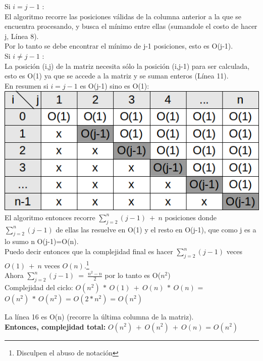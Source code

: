 Si $i=j-1$ :\\
El algoritmo recorre las posiciones válidas de la columna anterior a la que se encuentra procesando, y busca el mínimo entre ellas (sumandole el costo de hacer j, Línea 8).\\
Por lo tanto se debe encontrar el mínimo de j-1 posiciones, esto es O(j-1).\\

Si $i\neq j-1$ :\\
La posición (i,j) de la matriz necesita sólo la posición (i,j-1) para ser calculada, esto es O(1) ya que se accede a la matriz y se suman enteros (Línea 11).\\

En resumen si $i=j-1$ es O(j-1) sino es O(1):\\

\includegraphics[scale=0.7]{ej1/complejidad2.png}\\

El algoritmo entonces recorre $ \sum_{j=2}^{n} (j-1)\ +\ n$ posiciones donde $ \sum_{j=2}^{n} (j-1)$ de ellas las resuelve en O(1) y el resto en O(j-1), que como j es a lo sumo n O(j-1)=O(n).\\

Puedo decir entonces que la complejidad final es hacer $\sum_{j=2}^{n} (j-1)$ veces $O(1)\ +\ n$ veces $O(n)$.\footnote{Disculpen el abuso de notación}\\

Ahora $\sum_{j=2}^{n} (j-1)\ =\ \frac{n^{2}-n}{2}$ por lo tanto es O($n^{2}$)\\

Complejidad del ciclo: $O(n^{2})\ *\ O(1)\ +\ O(n)\ *\ O(n)$ = $O(n^{2})\ *\ O(n^{2})$ = $O(2*n^{2})$ = $O(n^{2})$

La línea 16 es O(n) (recorre la última columna de la matriz).\\

\textbf{Entonces, complejidad total:}
$O(n^{2})\ +\ O(n^{2})\ +\ O(n)$ = $O(n^{2})$
